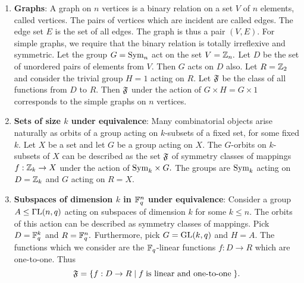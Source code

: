 \begin{enumerate}
\item
{\bf Graphs}: A graph on $n$ vertices is a binary relation on a set 
$V$ of $n$ elements, called vertices. 
The pairs of vertices which are incident are called edges. 
The edge set $E$ is the set of all edges. The graph is thus a pair $(V,E)$. 
For simple graphs, we require that the binary relation is 
totally irreflexive and symmetric. 
Let the group $G = {\rm Sym}_n$ act on the set $V = {\mathbb Z}_n.$ Let $D$ be the set of 
unordered pairs of elements from $V$. Then $G$ acts on $D$ also. 
Let $R = {\mathbb Z}_2$ and consider the trivial group $H=1$ acting on $R$. 
Let ${\mathfrak F}$ be the class of all functions from $D$ to $R$.
Then ${\mathfrak F}$ under the action of $G \times H = G \times 1$ 
corresponds to the simple graphs on $n$ vertices.
\item
{\bf Sets of size $k$ under equivalence}: 
Many combinatorial objects arise naturally as orbits of a group acting on 
$k$-subsets of a fixed set, for some fixed $k$. 
Let $X$ be a set and let $G$ be a group acting on $X.$ 
The $G$-orbits on $k$-subsets of $X$ can be described as the set ${\mathfrak F}$ 
of symmetry classes of mappings $f: {\mathbb Z}_k \rightarrow X$ 
under the action of ${\rm Sym}_k \times G.$ 
The groups are ${\rm Sym}_k$ acting on $D = {\mathbb Z}_k$ and $G$ acting on $R=X$.
\item
{\bf Subspaces of dimension $k$ in ${\mathbb F}_q^n$ under equivalence}: 
Consider a group $A \le \Gamma {\rm L}(n,q)$ 
acting on subspaces of dimension $k$ for some $k \le n.$
The orbits of this action can be described as symmetry classes of mappings. 
Pick $D = {\mathbb F}_q^k$ and $R = {\mathbb F}_q^n.$ 
Furthermore, pick $G = {\rm GL}(k,q)$ and $H = A$.
The functions which we consider are the ${\mathbb F}_q$-linear functions $f : D \rightarrow R$ 
which are one-to-one. Thus
$$
{\mathfrak F} = \{ f : D \rightarrow R \mid f \; \mbox{is linear and one-to-one}\; \}. 
$$
\end{enumerate}


